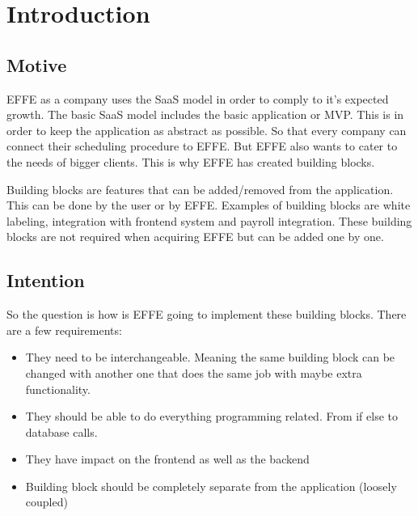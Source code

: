\chapter{Introduction}

\section{Motive}
EFFE as a company uses the SaaS model in order to comply to it’s expected growth. The basic SaaS model includes the basic application or MVP. This is in order to keep the application as abstract as possible. So that every company can connect their scheduling procedure to EFFE. But EFFE also wants to cater to the needs of bigger clients. This is why EFFE has created building blocks.

Building blocks are features that can be added/removed from the application. This can be done by the user or by EFFE. Examples of building blocks are white labeling, integration with frontend system and payroll integration. These building blocks are not required when acquiring EFFE but can be added one by one.

\section{Intention}
\label{sec:Intention}

So the question is how is EFFE going to implement these building blocks. There are a few requirements:
\begin{itemize}
	\item They need to be interchangeable. Meaning the same building block can be changed with another one that does the same job with maybe extra functionality.

	\item They should be able to do everything programming related. From if else to database calls.

	\item They have impact on the frontend as well as the backend

	\item Building block should be completely separate from the application (loosely coupled)
\end{itemize}
